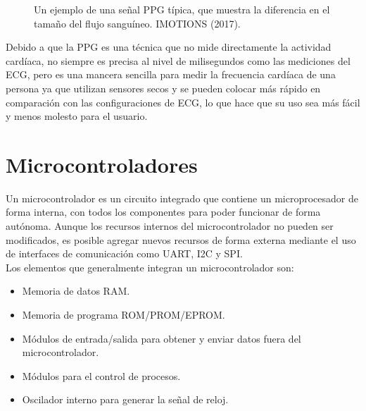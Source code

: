 		\begin{figure}[htbp!]
			\centering
			\caption{Un ejemplo de una señal PPG típica, que muestra la diferencia en el tamaño del flujo sanguíneo. IMOTIONS (2017).}
			\label{fig:PPGwave}
		\end{figure}
			
			Debido a que la PPG es una técnica que no mide directamente la actividad cardíaca, no siempre es precisa al nivel de milisegundos como las mediciones del ECG, pero es una mancera sencilla para medir la frecuencia cardíaca de una persona ya que utilizan sensores secos y se pueden colocar más rápido en comparación con las configuraciones de ECG, lo que hace que su uso sea más fácil y menos molesto para el usuario. \cite{imotionsECG}
		
	\section{Microcontroladores}
	Un microcontrolador es  un  circuito  integrado  que  contiene  un  microprocesador  de  forma  interna,  con  todos  los  componentes  para  poder  funcionar  de  forma  autónoma. Aunque los recursos internos del microcontrolador no pueden ser modificados, es posible agregar nuevos recursos de forma externa mediante el uso de interfaces de comunicación como UART, I2C y SPI. \cite{garcia2017} \\
	
	Los elementos que generalmente integran un microcontrolador son:
	\begin{itemize}
		\item Memoria de datos RAM.
		\item Memoria de programa ROM/PROM/EPROM.
		\item Módulos de entrada/salida para obtener y enviar datos fuera del microcontrolador.
		\item Módulos para el control de procesos.
		\item Oscilador interno para generar la señal de reloj.
	\end{itemize}

	